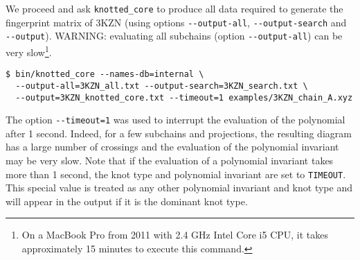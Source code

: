 We proceed and ask \lstinline{knotted_core} to produce all data required to generate the fingerprint matrix of 3KZN (using options \lstinline{--output-all}, \lstinline{--output-search} and \lstinline{--output}). WARNING: evaluating all subchains (option \lstinline{--output-all}) can be very slow\footnote{On a MacBook Pro from 2011 with 2.4 GHz Intel Core i5 CPU, it takes approximately 15 minutes to execute this command.}.
\begin{lstlisting}
$ bin/knotted_core --names-db=internal \
  --output-all=3KZN_all.txt --output-search=3KZN_search.txt \
  --output=3KZN_knotted_core.txt --timeout=1 examples/3KZN_chain_A.xyz
\end{lstlisting}
The option \lstinline{--timeout=1} was used to interrupt the evaluation of the polynomial after 1 second. Indeed, for a few subchains and projections, the resulting diagram has a large number of crossings and the evaluation of the polynomial invariant may be very slow. Note that if the evaluation of a polynomial invariant takes more than 1 second, the knot type and polynomial invariant are set to \lstinline{TIMEOUT}. This special value is treated as any other polynomial invariant and knot type and will appear in the output if it is the dominant knot type.

